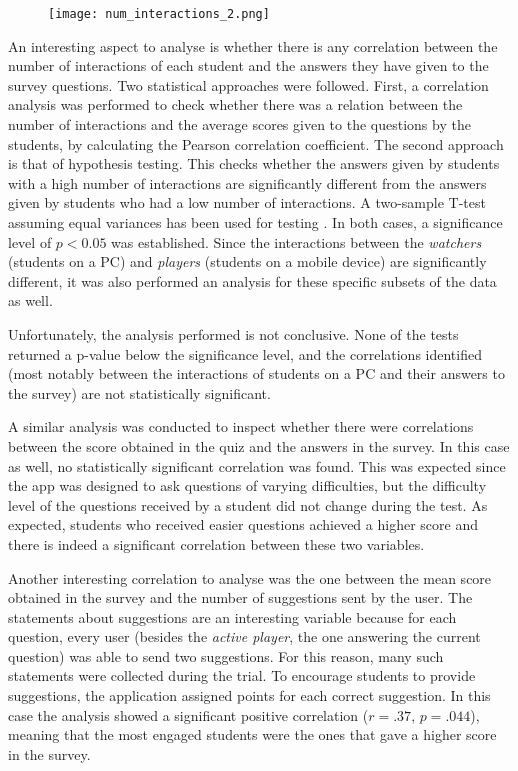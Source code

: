 \begin{figure}[htbp]
    \centering
    \texttt{[image: num\_interactions\_2.png]}
    \caption{\fontsize{10pt}{11pt}}
    \label{fig:num_interactions}
\end{figure}

An interesting aspect to analyse is whether there is any correlation between the number of interactions of each student and the answers they have given to the survey questions.
Two statistical approaches were followed.
First,  a correlation analysis was performed to check whether there was a relation between the number of interactions and the average scores given to the questions by the students, by calculating the Pearson correlation coefficient.
The second approach is that of hypothesis testing. This checks whether the answers given by students with a high number of interactions are significantly different from the answers given by students who had a low number of interactions.
A two-sample T-test assuming equal variances has been used for testing \citep{welch1947generalization}.
In both cases, a significance level of $p < 0.05$ was established.
Since the interactions between the \textit{watchers} (students on a PC) and \textit{players} (students on a mobile device) are significantly different, it was also performed an analysis for these specific subsets of the data as well.

Unfortunately, the analysis performed is not conclusive.
None of the tests returned a p-value below the significance level, and the correlations identified (most notably between the interactions of students on a PC and their answers to the survey) are not statistically significant.

A similar analysis was conducted to inspect whether there were correlations between the score obtained in the quiz and the answers in the survey. In this case as well, no statistically significant correlation was found.
This was  expected since the app was designed to ask questions of varying difficulties, but the difficulty level of the questions received by a student did not change during the test.
As expected, students who received easier questions achieved a higher score and there is indeed a significant correlation between these two variables.

Another interesting correlation to analyse was the one between the mean score obtained in the survey and the number of suggestions sent by the user.
The statements about suggestions are an interesting variable because for each question, every user (besides the \textit{active player}, the one answering the current question) was able to send two suggestions.
For this reason, many such statements were collected during the trial.
To encourage students to provide suggestions, the application assigned points for each correct suggestion.
In this case the analysis showed a significant positive correlation ($r = .37$, $p = .044$), meaning that the most engaged students were the ones that gave a higher score in the survey.

